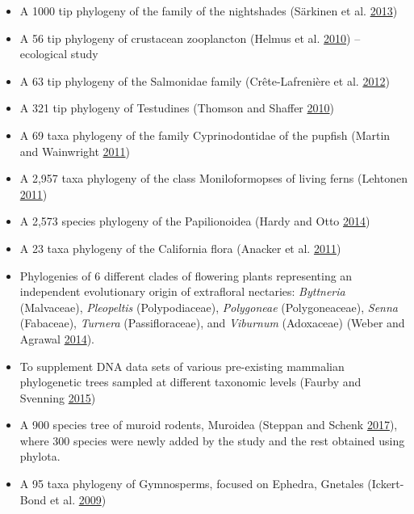 \documentclass[]{article}
\providecommand{\tightlist}{%
  \setlength{\itemsep}{0pt}\setlength{\parskip}{0pt}}
\begin{document}
\begin{enumerate}
  \begin{itemize}
  \tightlist
  \item
    A 1000 tip phylogeny of the family of the nightshades (Särkinen et al. \protect\hyperlink{ref-sarkinen2013solanaceae}{2013})
  \item
    A 56 tip phylogeny of crustacean zooplancton (Helmus et al. \protect\hyperlink{ref-helmus2010communities}{2010}) -- ecological study
  \item
    A 63 tip phylogeny of the Salmonidae family (Crête-Lafrenière et al. \protect\hyperlink{ref-crete2012salmonidae}{2012})
  \item
    A 321 tip phylogeny of Testudines (Thomson and Shaffer \protect\hyperlink{ref-thomson2010sparse}{2010})
  \item
    A 69 taxa phylogeny of the family Cyprinodontidae of the pupfish (Martin and Wainwright \protect\hyperlink{ref-martin2011trophic}{2011})
  \item
    A 2,957 taxa phylogeny of the class Moniloformopses of living ferns (Lehtonen \protect\hyperlink{ref-lehtonen2011towards}{2011})
  \item
    A 2,573 species phylogeny of the Papilionoidea (Hardy and Otto \protect\hyperlink{ref-hardy2014specialization}{2014})
  \item
    A 23 taxa phylogeny of the California flora (Anacker et al. \protect\hyperlink{ref-anacker2011origins}{2011})
  \item
    Phylogenies of 6 different clades of flowering plants representing an independent
    evolutionary origin of extrafloral nectaries: \emph{Byttneria} (Malvaceae), \emph{Pleopeltis} (Polypodiaceae),
    \emph{Polygoneae} (Polygoneaceae), \emph{Senna} (Fabaceae), \emph{Turnera} (Passifloraceae), and \emph{Viburnum}
    (Adoxaceae) (Weber and Agrawal \protect\hyperlink{ref-weber2014defense}{2014}).
  \item
    To supplement DNA data sets of various pre-existing mammalian phylogenetic trees
    sampled at different taxonomic levels (Faurby and Svenning \protect\hyperlink{ref-faurby2015species}{2015})
  \item
    A 900 species tree of muroid rodents, Muroidea (Steppan and Schenk \protect\hyperlink{ref-steppan2017muroid}{2017}), where 300
    species were newly added by the study and the rest obtained using phylota.
  \item
    A 95 taxa phylogeny of Gymnosperms, focused on Ephedra, Gnetales (Ickert-Bond et al. \protect\hyperlink{ref-ickert2009fossil}{2009})

\end{itemize}
\end{enumerate}
\end{document}

